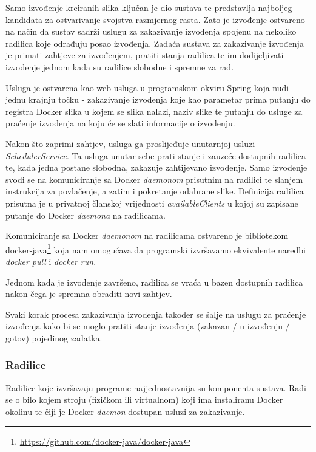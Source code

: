 \documentclass[times, utf8, zavrsni]{fer}
\begin{document}
{Samo izvođenje kreiranih slika ključan je dio sustava te predstavlja najboljeg kandidata za ostvarivanje svojstva razmjernog rasta. Zato je izvođenje ostvareno na način da sustav sadrži uslugu za zakazivanje izvođenja spojenu na nekoliko radilica koje odrađuju posao izvođenja. Zadaća sustava za zakazivanje izvođenja je primati zahtjeve za izvođenjem, pratiti stanja radilica te im dodijeljivati izvođenje jednom kada su radilice slobodne i spremne za rad.

Usluga je ostvarena kao web usluga u programskom okviru Spring koja nudi jednu krajnju točku - zakazivanje izvođenja koje kao parametar prima putanju do registra Docker slika u kojem se slika nalazi, naziv slike te putanju do usluge za praćenje izvođenja na koju će se slati informacije o izvođenju.

Nakon što zaprimi zahtjev, usluga ga proslijeđuje unutarnjoj usluzi {\textit{SchedulerService}}. Ta usluga unutar sebe prati stanje i zauzeće dostupnih radilica te, kada jedna postane slobodna, zakazuje zahtijevano izvođenje. Samo izvođenje svodi se na komuniciranje sa Docker {\textit{daemonom}} prisutnim na radilici te slanjem instrukcija za povlačenje, a zatim i pokretanje odabrane slike. Definicija radilica prisutna je u privatnoj članskoj vrijednosti {\textit{availableClients}} u kojoj su zapisane putanje do Docker {\textit{daemona}} na radilicama.

Komuniciranje sa Docker {\textit{daemonom}} na radilicama ostvareno je bibliotekom docker-java{\footnote{\url{https://github.com/docker-java/docker-java}}} koja nam omogućava da programski izvršavamo ekvivalente naredbi {\textit{docker pull}} i {\textit{docker run}}.

Jednom kada je izvođenje završeno, radilica se vraća u bazen dostupnih radilica nakon čega je spremna obraditi novi zahtjev.

Svaki korak procesa zakazivanja izvođenja također se šalje na uslugu za praćenje izvođenja kako bi se moglo pratiti stanje izvođenja (zakazan / u izvođenju / gotov) pojedinog zadatka.

\subsubsection{Radilice}

Radilice koje izvršavaju programe najjednostavnija su komponenta sustava. Radi se o bilo kojem stroju (fizičkom ili virtualnom) koji ima instaliranu Docker okolinu te čiji je Docker {\textit{daemon}} dostupan usluzi za zakazivanje.

}
\end{document}
